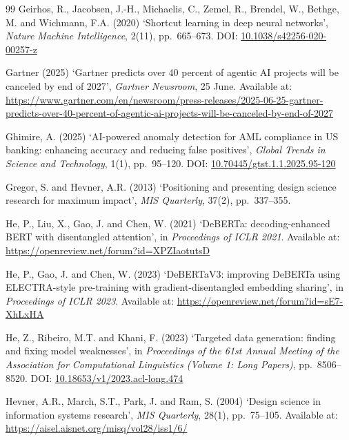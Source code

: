 \documentclass[12pt,a4paper]{article}
\begin{document}
\begin{thebibliography}{99}
Geirhos, R., Jacobsen, J.-H., Michaelis, C., Zemel, R., Brendel, W.,
Bethge, M. and Wichmann, F.A. (2020)
`Shortcut learning in deep neural networks',
\textit{Nature Machine Intelligence}, 2(11), pp.~665--673.
DOI: \href{https://doi.org/10.1038/s42256-020-00257-z}{10.1038/s42256-020-00257-z}

Gartner (2025)
`Gartner predicts over 40 percent of agentic AI projects will be canceled by
end of 2027', \textit{Gartner Newsroom}, 25 June.
Available at: \url{https://www.gartner.com/en/newsroom/press-releases/2025-06-25-gartner-predicts-over-40-percent-of-agentic-ai-projects-will-be-canceled-by-end-of-2027}

Ghimire, A. (2025)
`AI-powered anomaly detection for AML compliance in US banking: enhancing
accuracy and reducing false positives',
\textit{Global Trends in Science and Technology}, 1(1), pp.~95--120.
DOI: \href{https://doi.org/10.70445/gtst.1.1.2025.95-120}{10.70445/gtst.1.1.2025.95-120}

Gregor, S. and Hevner, A.R. (2013)
`Positioning and presenting design science research for maximum impact',
\textit{MIS Quarterly}, 37(2), pp.~337--355.

He, P., Liu, X., Gao, J. and Chen, W. (2021)
`DeBERTa: decoding-enhanced BERT with disentangled attention',
in \textit{Proceedings of ICLR 2021}.
Available at: \url{https://openreview.net/forum?id=XPZIaotutsD}

He, P., Gao, J. and Chen, W. (2023)
`DeBERTaV3: improving DeBERTa using ELECTRA-style pre-training with
gradient-disentangled embedding sharing',
in \textit{Proceedings of ICLR 2023}.
Available at: \url{https://openreview.net/forum?id=sE7-XhLxHA}

He, Z., Ribeiro, M.T. and Khani, F. (2023)
`Targeted data generation: finding and fixing model weaknesses',
in \textit{Proceedings of the 61st Annual Meeting of the Association for
Computational Linguistics (Volume 1: Long Papers)}, pp.~8506--8520.
DOI: \href{https://doi.org/10.18653/v1/2023.acl-long.474}{10.18653/v1/2023.acl-long.474}

Hevner, A.R., March, S.T., Park, J. and Ram, S. (2004)
`Design science in information systems research',
\textit{MIS Quarterly}, 28(1), pp.~75--105.
Available at: \url{https://aisel.aisnet.org/misq/vol28/iss1/6/}


\end{thebibliography}
\end{document}
